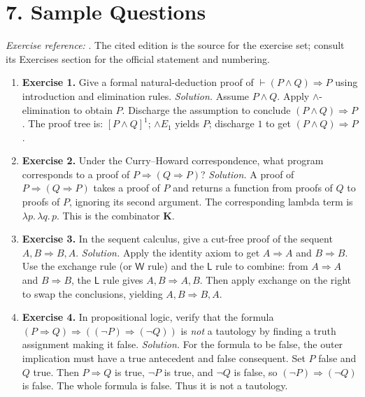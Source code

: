 \section*{7. Sample Questions}
\emph{Exercise reference:} \cite{proof_ref1}. The cited edition is the source for the exercise set; consult its Exercises section for the official statement and numbering.
\begin{enumerate}[leftmargin=*,itemsep=0.9em]
\item \textbf{Exercise 1.} Give a formal natural-deduction proof of $\vdash (P\land Q)\Rightarrow P$ using introduction and elimination rules. \emph{Solution.} Assume $P\land Q$. Apply $\land$-elimination to obtain $P$. Discharge the assumption to conclude $(P\land Q)\Rightarrow P$. The proof tree is: $[P\land Q]^1$; $\land E_1$ yields $P$; discharge $1$ to get $(P\land Q)\Rightarrow P$.

\item \textbf{Exercise 2.} Under the Curry--Howard correspondence, what program corresponds to a proof of $P\Rightarrow(Q\Rightarrow P)$? \emph{Solution.} A proof of $P\Rightarrow(Q\Rightarrow P)$ takes a proof of $P$ and returns a function from proofs of $Q$ to proofs of $P$, ignoring its second argument. The corresponding lambda term is $\lambda p.\,\lambda q.\, p$. This is the combinator $\mathbf{K}$.

\item \textbf{Exercise 3.} In the sequent calculus, give a cut-free proof of the sequent $A,B\Longrightarrow B,A$. \emph{Solution.} Apply the identity axiom to get $A\Longrightarrow A$ and $B\Longrightarrow B$. Use the exchange rule (or $\mathsf{W}$ rule) and the $\mathsf{L}$ rule to combine: from $A\Longrightarrow A$ and $B\Longrightarrow B$, the $\mathsf{L}$ rule gives $A,B\Longrightarrow A,B$. Then apply exchange on the right to swap the conclusions, yielding $A,B\Longrightarrow B,A$.

\item \textbf{Exercise 4.} In propositional logic, verify that the formula $(P\Rightarrow Q)\Rightarrow((\neg P)\Rightarrow(\neg Q))$ is \emph{not} a tautology by finding a truth assignment making it false. \emph{Solution.} For the formula to be false, the outer implication must have a true antecedent and false consequent. Set $P$ false and $Q$ true. Then $P\Rightarrow Q$ is true, $\neg P$ is true, and $\neg Q$ is false, so $(\neg P)\Rightarrow(\neg Q)$ is false. The whole formula is false. Thus it is not a tautology.


\end{enumerate}
